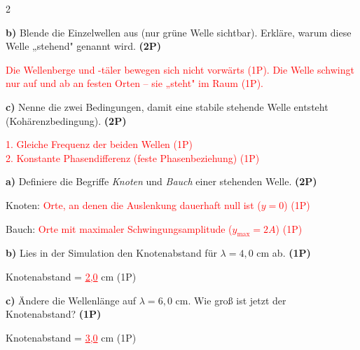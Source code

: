 \documentclass[11pt,a4paper]{article}
\begin{document}
\begin{multicols}{2}
\begin{tcolorbox}[colback=white,colframe=black,coltitle=black,colbacktitle=white,
    title=\textbf{1: Beobachtung der Superposition}]
\vspace{0.3cm}

\textbf{b)} Blende die Einzelwellen aus (nur grüne Welle sichtbar). Erkläre, warum diese Welle „stehend" genannt wird. \textbf{(2P)}

\textcolor{red}{Die Wellenberge und -täler bewegen sich nicht vorwärts {\color{blue}(1P)}. Die Welle schwingt nur auf und ab an festen Orten -- sie „steht" im Raum {\color{blue}(1P)}.}

\vspace{0.3cm}

\textbf{c)} Nenne die zwei Bedingungen, damit eine stabile stehende Welle entsteht (Kohärenzbedingung). \textbf{(2P)}

\textcolor{red}{1. Gleiche Frequenz der beiden Wellen {\color{blue}(1P)}\\
2. Konstante Phasendifferenz (feste Phasenbeziehung) {\color{blue}(1P)}}

\end{tcolorbox}

\begin{tcolorbox}[colback=white,colframe=black,coltitle=black,colbacktitle=white,
    title=\textbf{2: Knoten und Bäuche}]

\textbf{a)} Definiere die Begriffe \emph{Knoten} und \emph{Bauch} einer stehenden Welle. \textbf{(2P)}

Knoten: \textcolor{red}{Orte, an denen die Auslenkung dauerhaft null ist ($y = 0$) {\color{blue}(1P)}}

Bauch: \textcolor{red}{Orte mit maximaler Schwingungsamplitude ($y_{\max} = 2A$) {\color{blue}(1P)}}

\vspace{0.3cm}

\textbf{b)} Lies in der Simulation den Knotenabstand für $\lambda = 4{,}0$ cm ab. \textbf{(1P)}

Knotenabstand = \textcolor{red}{\underline{\hspace{0.5cm}2,0\hspace{0.5cm}}} cm {\color{blue}(1P)}

\vspace{0.3cm}

\textbf{c)} Ändere die Wellenlänge auf $\lambda = 6{,}0$ cm. Wie groß ist jetzt der Knotenabstand? \textbf{(1P)}

Knotenabstand = \textcolor{red}{\underline{\hspace{0.5cm}3,0\hspace{0.5cm}}} cm {\color{blue}(1P)}


\end{tcolorbox}
\end{multicols}
\end{document}
